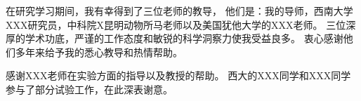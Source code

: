 
\begin{acknowledgements}

在研究学习期间，我有幸得到了三位老师的教导，
他们是：我的导师，西南大学XXX研究员，中科院X昆明动物所马老师以及美国犹他大学的XXX老师。
三位深厚的学术功底，严谨的工作态度和敏锐的科学洞察力使我受益良多。
衷心感谢他们多年来给予我的悉心教导和热情帮助。

感谢XXX老师在实验方面的指导以及教授的帮助。
西大的XXX同学和XXX同学参与了部分试验工作，在此深表谢意。

\end{acknowledgements}
